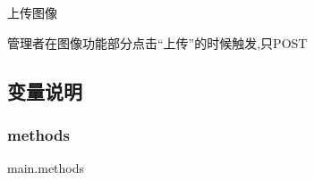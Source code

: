 上传图像 

管理者在图像功能部分点击“上传”的时候触发,只\+P\+O\+ST 

\subsection{变量说明}
\mbox{\label{group___xE8_xB7_xAF_xE7_x94_xB1_xE5_x87_xBD_xE6_x95_xB0_gad0a71fa7b4080e971323a6c3b1c16331}} 
\subsubsection{\texorpdfstring{methods}{methods}}
{\footnotesize\ttfamily main.\+methods}

